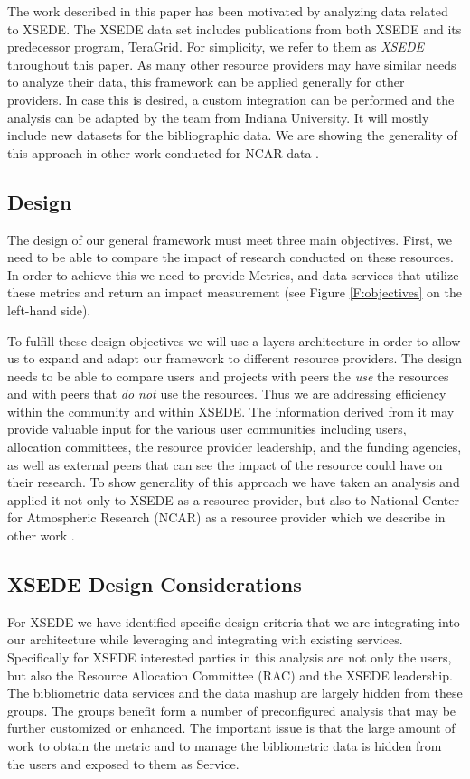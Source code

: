 \documentclass{sig-alternate}
\begin{document}
The work described in this paper has been motivated by analyzing data related to XSEDE. The XSEDE data set includes publications from both XSEDE and its predecessor program, TeraGrid. For simplicity, we refer to them as {\em XSEDE} throughout this paper. As many other resource providers may have similar needs to analyze their data, this framework can be applied generally for other  providers. In case this is desired, a custom integration can be performed and the analysis can be adapted by the team from Indiana University. It will mostly include new datasets for the bibliographic data. We are showing the generality of this approach in other work conducted for NCAR data \cite{?las15cluster}.


\subsection{Design}

The design of our general framework  must meet three main objectives.  First, we need to be able to compare the impact of research conducted on these resources. In order to achieve this we need to provide Metrics, and data services that utilize these metrics and return an impact measurement (see Figure \ref{F:objectives} on the left-hand side). 

To fulfill these design objectives we will use a layers architecture in order to allow us to expand and adapt our framework to different resource providers. The design needs to be able to compare users and projects with peers the {\em use} the resources and with peers that {\em do not} use the resources. Thus we are addressing efficiency within the community and within XSEDE. 
The information derived from it may provide valuable input for the various user communities including users, allocation committees, the resource provider leadership, and the funding agencies, as well as external peers that can see the impact of the resource could have on their research. To show generality of this approach we have taken an analysis and applied it not only to XSEDE as a resource provider, but also to National Center for Atmospheric Research (NCAR) as a resource provider which we describe in other work \cite{www-ncar}.

\subsection{XSEDE Design Considerations}

For XSEDE we have identified specific design criteria that we are integrating into our architecture while leveraging and integrating with existing services. Specifically for XSEDE interested parties in this analysis are not only the users, but also the Resource Allocation Committee (RAC) and the XSEDE leadership. The bibliometric data services and the data mashup are largely hidden from these groups. The groups benefit form a number of preconfigured analysis that may be further customized or enhanced. The important issue is that the large amount of work to obtain the metric and to manage the bibliometric data is hidden from the users and exposed to them as Service.
\end{document}

